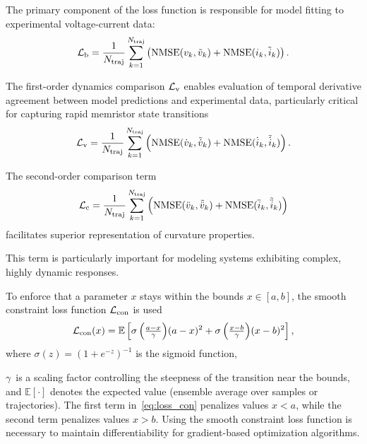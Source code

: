 \documentclass{ieeeaccess}
\begin{document}
The primary component of the loss function is responsible for model fitting to experimental voltage-current data:
\begin{equation}
  \mathcal{L}_{\text{b}} = \frac{1}{N_{\text{traj}}} \sum_{k=1}^{N_{\text{traj}}}\left(\operatorname{NMSE}(v_k,\tilde{v}_k)+\operatorname{NMSE}(i_k,\tilde{i}_k)\right).
  \label{eq:base_loss}
\end{equation}


The first-order dynamics comparison \(\mathcal{L}_{\text{v}}\) enables evaluation of temporal derivative agreement between model predictions and experimental data, particularly critical for capturing rapid memristor state transitions
\begin{equation}
  \mathcal{L}_{\text{v}} = \frac{1}{N_{\text{traj}}} \sum_{k=1}^{N_{\text{traj}}}\left(\operatorname{NMSE}(\dot{v}_k,\tilde{\dot{v}}_k)+\operatorname{NMSE}(\dot{i}_k,\tilde{\dot{i}}_k)\right). 
  \label{eq:loss_v}
\end{equation}

The second-order comparison term%
\begin{equation}
  \mathcal{L}_{\text{c}} = \frac{1}{N_{\text{traj}}} \sum_{k=1}^{N_{\text{traj}}}\left(\operatorname{NMSE}(\ddot{v}_k,\tilde{\ddot{v}}_k)+\operatorname{NMSE}(\ddot{i}_k,\tilde{\ddot{i}}_k)\right)
  \label{eq:loss_c}
\end{equation}
facilitates superior representation of curvature properties.

This term is particularly important for modeling systems exhibiting complex, highly dynamic responses.


To enforce that a parameter \(x\) stays within the bounds \(x\in[a,b]\), the smooth constraint loss function \(\mathcal{L}_{\text{con}}\) is used
\begin{equation}
  \mathcal{L}_{\text{con}} (x) = \mathbb{E}\left[ {\sigma\left(\tfrac{a-x}{\gamma}\right)}(a-x)^{2}+{\sigma\left(\tfrac{x-b}{\gamma}\right)}(x-b)^{2}\right],
  \label{eq:loss_con}
\end{equation}
where \(\sigma(z) = (1+e^{-z})^{-1} \) is the sigmoid function,

\(\gamma\)~is a scaling factor controlling the steepness of the transition near the bounds, and
\(\mathbb{E}[\cdot]\) denotes the expected value (ensemble average over samples or trajectories).
The first term in~\eqref{eq:loss_con} penalizes values \(x<a\), 
while the second term penalizes values \(x>b\).
Using the smooth constraint loss function is necessary to maintain differentiability for gradient-based optimization algorithms. 
\end{document}
